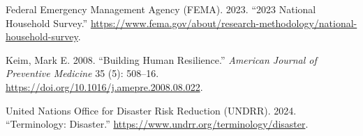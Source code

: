 \documentclass[
  letterpaper,
  DIV=11,
  numbers=noendperiod]{scrartcl}
\newlength{\cslhangindent}
\newenvironment{CSLReferences}[2] %
 {\begin{list}{}{%
  \setlength{\itemindent}{0pt}
  \setlength{\leftmargin}{0pt}
  \setlength{\parsep}{0pt}
  \ifodd #1
   \setlength{\leftmargin}{\cslhangindent}
   \setlength{\itemindent}{-1\cslhangindent}
  \fi
  \setlength{\itemsep}{#2\baselineskip}}}
 {\end{list}}
\begin{document}
\label{refs}
\begin{CSLReferences}{1}{0}
Federal Emergency Management Agency (FEMA). 2023. {``{2023 National
Household Survey}.''}
\url{https://www.fema.gov/about/research-methodology/national-household-survey}.

Keim, Mark E. 2008. {``Building Human Resilience.''} \emph{American
Journal of Preventive Medicine} 35 (5): 508--16.
\url{https://doi.org/10.1016/j.amepre.2008.08.022}.

United Nations Office for Disaster Risk Reduction (UNDRR). 2024.
{``Terminology: Disaster.''}
\url{https://www.undrr.org/terminology/disaster}.

\end{CSLReferences}
\end{document}
